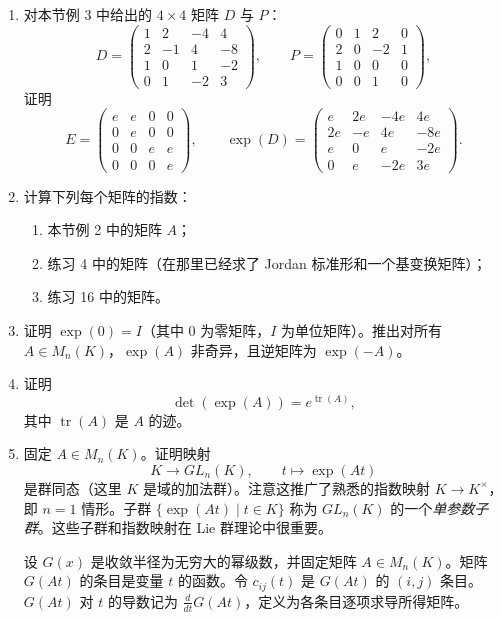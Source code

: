 \begin{enumerate}[label=\arabic*.]
\item 对本节例 3 中给出的 $4\times4$ 矩阵 $D$ 与 $P$：
\[
D=\begin{pmatrix}
1&2&-4&4\\
2&-1&4&-8\\
1&0&1&-2\\
0&1&-2&3
\end{pmatrix},
\qquad
P=\begin{pmatrix}
0&1&2&0\\
2&0&-2&1\\
1&0&0&0\\
0&0&1&0
\end{pmatrix},
\]
证明
\[
E=\begin{pmatrix}
e&e&0&0\\
0&e&0&0\\
0&0&e&e\\
0&0&0&e
\end{pmatrix},
\qquad
\exp(D)=\begin{pmatrix}
e&2e&-4e&4e\\
2e&-e&4e&-8e\\
e&0&e&-2e\\
0&e&-2e&3e
\end{pmatrix}.
\]

\item 计算下列每个矩阵的指数：
\begin{enumerate}[label=(\alph*)]
\item 本节例 2 中的矩阵 $A$；
\item 练习 4 中的矩阵（在那里已经求了 Jordan 标准形和一个基变换矩阵）；
\item 练习 16 中的矩阵。
\end{enumerate}

\item 证明 $\exp(0)=I$（其中 $0$ 为零矩阵，$I$ 为单位矩阵）。推出对所有 $A\in M_n(K)$，$\exp(A)$ 非奇异，且逆矩阵为 $\exp(-A)$。

\item 证明
\[
\det(\exp(A))=e^{\operatorname{tr}(A)},
\]
其中 $\operatorname{tr}(A)$ 是 $A$ 的迹。

\item 固定 $A\in M_n(K)$。证明映射
\[
K\longrightarrow GL_n(K),
\qquad
 t\longmapsto \exp(At)
\]
是群同态（这里 $K$ 是域的加法群）。注意这推广了熟悉的指数映射 $K\to K^\times$，即 $n=1$ 情形。子群 $\{\exp(At)\mid t\in K\}$ 称为 $GL_n(K)$ 的一个\emph{单参数子群}。这些子群和指数映射在 Lie 群理论中很重要。

设 $G(x)$ 是收敛半径为无穷大的幂级数，并固定矩阵 $A\in M_n(K)$。矩阵 $G(At)$ 的条目是变量 $t$ 的函数。令 $c_{ij}(t)$ 是 $G(At)$ 的 $(i,j)$ 条目。$G(At)$ 对 $t$ 的导数记为 $\frac{d}{dt}G(At)$，定义为各条目逐项求导所得矩阵。


\end{enumerate}

